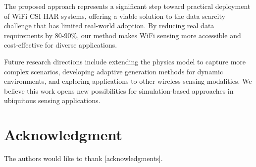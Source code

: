 \documentclass[journal]{IEEEtran}
\begin{document}
The proposed approach represents a significant step toward practical deployment of WiFi CSI HAR systems, offering a viable solution to the data scarcity challenge that has limited real-world adoption. By reducing real data requirements by 80-90\%, our method makes WiFi sensing more accessible and cost-effective for diverse applications.

Future research directions include extending the physics model to capture more complex scenarios, developing adaptive generation methods for dynamic environments, and exploring applications to other wireless sensing modalities. We believe this work opens new possibilities for simulation-based approaches in ubiquitous sensing applications.

\section*{Acknowledgment}

The authors would like to thank [acknowledgments].



\end{document}
